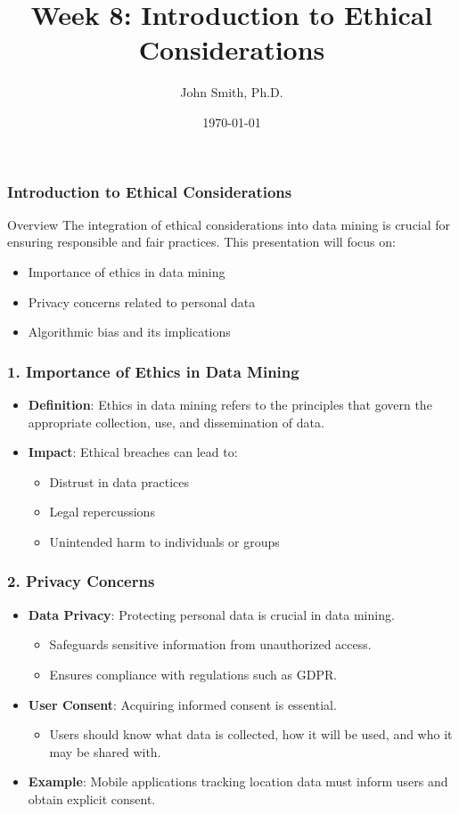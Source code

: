 \documentclass[aspectratio=169]{beamer}
\title[Ethical Considerations]{Week 8: Introduction to Ethical Considerations}
\author[J. Smith]{John Smith, Ph.D.}
\institute[University Name]{
  Department of Computer Science\\
  University Name\\
  Email: email@university.edu
}
\date{\today}
\begin{document}
\frame{\titlepage}

\begin{frame}[fragile]
    \frametitle{Introduction to Ethical Considerations}
    \begin{block}{Overview}
        The integration of ethical considerations into data mining is crucial for ensuring responsible and fair practices. 
        This presentation will focus on:
        \begin{itemize}
            \item Importance of ethics in data mining 
            \item Privacy concerns related to personal data 
            \item Algorithmic bias and its implications 
        \end{itemize}
    \end{block}
\end{frame}

\begin{frame}[fragile]
    \frametitle{1. Importance of Ethics in Data Mining}
    \begin{itemize}
        \item \textbf{Definition}: Ethics in data mining refers to the principles that govern the appropriate collection, use, and dissemination of data.
        \item \textbf{Impact}: Ethical breaches can lead to:
        \begin{itemize}
            \item Distrust in data practices
            \item Legal repercussions
            \item Unintended harm to individuals or groups
        \end{itemize}
    \end{itemize}
\end{frame}

\begin{frame}[fragile]
    \frametitle{2. Privacy Concerns}
    \begin{itemize}
        \item \textbf{Data Privacy}: Protecting personal data is crucial in data mining.
        \begin{itemize}
            \item Safeguards sensitive information from unauthorized access.
            \item Ensures compliance with regulations such as GDPR.
        \end{itemize}
        \item \textbf{User Consent}: Acquiring informed consent is essential.
        \begin{itemize}
            \item Users should know what data is collected, how it will be used, and who it may be shared with.
        \end{itemize}
        \item \textbf{Example}: Mobile applications tracking location data must inform users and obtain explicit consent.
    \end{itemize}
\end{frame}
\end{document}
